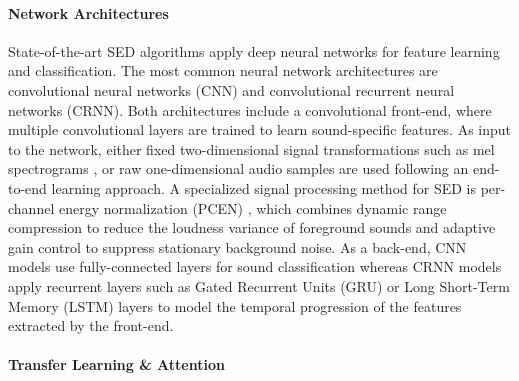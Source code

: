\documentclass[11pt]{article}
\begin{document}
\paragraph{Network Architectures}

State-of-the-art SED algorithms apply deep neural networks for feature learning and classification.
The most common neural network architectures are convolutional neural networks (CNN) and convolutional recurrent neural networks (CRNN). 
Both architectures include a convolutional front-end, where multiple convolutional layers are trained to learn sound-specific features.
As input to the network, either fixed two-dimensional signal transformations such as mel spectrograms \cite{Hou:2019:SoundEvent:ICASSP}, or raw one-dimensional audio samples are used  \cite{Cakir:2018:EndtoEndAED:IJCNN} following an end-to-end learning approach. 
A specialized signal processing method for SED is per-channel energy normalization (PCEN) \cite{Lostanlen:2018:PCEN:SPL}, which combines dynamic range compression to reduce the loudness variance of foreground sounds and adaptive gain control to suppress stationary background noise.
As a back-end, CNN models use fully-connected layers for sound classification whereas CRNN models apply recurrent layers such as Gated Recurrent Units (GRU) or Long Short-Term Memory (LSTM) layers to model the temporal progression of the features extracted by the front-end.

\paragraph{Transfer Learning \& Attention}
\end{document}
